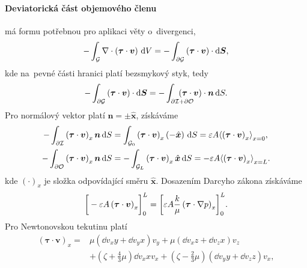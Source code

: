 \paragraph{Deviatorická část objemového členu} má formu potřebnou pro aplikaci věty o~divergenci,
\begin{equation}
    -\int_{\mathcal{G}}\nabla\cdot\left(\bm{\tau}\cdot \bm{v}\right) \,\mathrm{d}{V}
    =-\int_{\partial\mathcal{G}}\left(\bm{\tau}\cdot\bm{v}\right)\cdot\mathrm{d}\bm{S},
\end{equation}
kde na~pevné části hranici platí bezsmykový styk, tedy
\begin{equation}
    -\int_{\partial\mathcal{G}}\left(\bm{\tau}\cdot\bm{v}\right)\cdot\dvec{S}
    =-\int_{\partial\mathcal{I}+\partial\mathcal{O}}\mkern-36mu\left(\bm{\tau}\cdot\bm{v}\right)\cdot\bm{n}\d{S}.
\end{equation}
Pro normálový vektor platí $\bm{n}=\pm\hat{\bm{x}}$, získáváme
\begin{subequations}
    \begin{align}
        -\int_{\partial\mathcal{I}}\left(\bm{\tau}\cdot\bm{v}\right)_x\bm{n}\,\mathrm{d}{S}&
        =\int_{\mathcal{G}_0}\left(\bm{\tau}\cdot\bm{v}\right)_x\left(-\hat{\bm{x}}\right)\,\mathrm{d}{S}
        =\varepsilon A{\left\langle \left(\bm{\tau}\cdot\bm{v}\right)_x \right\rangle}_{x=0},
        \\
        -\int_{\partial\mathcal{O}}\left(\bm{\tau}\cdot\bm{v}\right)_x\bm{n}\,\mathrm{d}{S}&
        =-\int_{\mathcal{G}_L}\left(\bm{\tau}\cdot\bm{v}\right)_x\hat{\bm{x}}\,\mathrm{d}{S}
        =-\varepsilon A{\left\langle \left(\bm{\tau}\cdot\bm{v}\right)_x \right\rangle}_{x=L}.
    \end{align}
\end{subequations}
kde $\left(\cdot\right)_x$ je složka odpovídající směru $\hat{\bm{x}}$. Dosazením Darcyho zákona získáváme
\begin{equation}
    {\left[\vphantom{\frac{k}{\mu}}-\varepsilon A \left(\bm{\tau}\cdot \bm{v}\right)_x \right]}_0^L={\left[ \varepsilon A \frac{k}{\mu}\left(\bm{\tau}\cdot \nabla p\right)_x \right]}_0^L.
\end{equation}
Pro Newtonovskou tekutinu platí
\begin{align}
    \left(\bm{\tau}\cdot\bm{v}\right)_x
    =&\mu\left(\dd{v_x}{y}+\dd{v_y}{x}\right)v_y+\mu\left(\dd{v_x}{z}+\dd{v_z}{x}\right)v_z\nonumber\\
    &+\left(\zeta+\frac{4}{3}\mu\right)\dd{v_x}{x}v_x+\left(\zeta-\frac{2}{3}\mu\right)\left(\dd{v_y}{y}+\dd{v_z}{z}\right)v_x,
\end{align}
